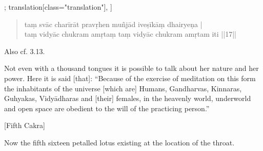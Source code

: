 \begin{alignment}[
   texts=edition[class="edition"];
    translation[class="translation"],
  ]
\begin{translation}
\begin{tlate}
{\begin{quote}
taṃ svāc charīrāt pravṛhen muñjād iveṣīkāṃ dhairyeṇa |\\
taṃ vidyāc chukram amṛtaṃ taṃ vidyāc chukram amṛtam iti ||17||\end{quote}
Also cf.  3.13.}
Not even with a thousand tongues it is possible to talk about her nature and her power. Here it is said [that]: ``Because of the exercise of meditation on this form the inhabitants of the universe [which are] Humans, Gandharvas, Kinnaras, Guhyakas, Vidyādharas and [their] females, in the heavenly world, underworld and open space are obedient to the will of the practicing person.''\vfill
\vfill
     \smallskip
     \centerline{\textrm{\small{[Fifth Cakra]}}}
     \smallskip
 \indent Now the fifth sixteen petalled lotus existing at the location of the throat.    
    \end{tlate}
  \end{translation}
  \ekdpb*{}
\end{alignment}
